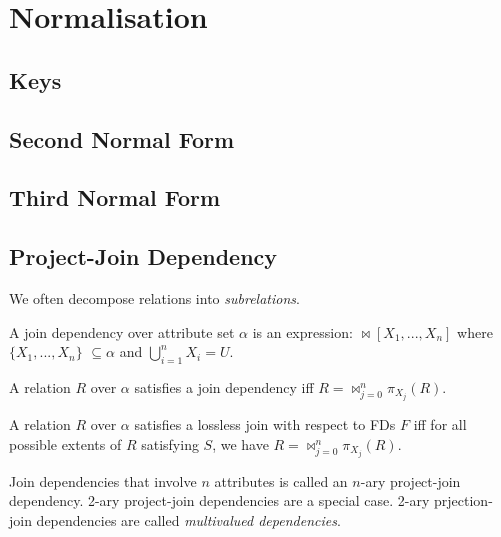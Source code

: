 \chapter{Normalisation}



\section{Keys}


\section{Second Normal Form}



\section{Third Normal Form}



\section{Project-Join Dependency}


We often decompose relations into \textit{subrelations}. 

A join dependency over attribute set $\alpha$ 
is an expression: $\bowtie[X_1, ..., X_n]$ 
where $\{X_1, ...,  X_n\}$ $\subseteq \alpha$ 
and $\bigcup^{n}_{i=1} X_i = U$.

A relation $R$ over $\alpha$ satisfies a 
join dependency
iff $R = \bowtie^{n}_{j=0} \pi_{X_j}(R)$.

A relation $R$ over $\alpha$ satisfies a 
lossless join with respect to FDs $F$ 
iff for all possible extents of $R$ 
satisfying $S$, we have $R = \bowtie^{n}_{j=0} \pi_{X_j}(R)$. 




Join dependencies that involve $n$ attributes is called an 
$n$-ary project-join dependency. 
2-ary project-join dependencies are a special case. 2-ary prjection-join dependencies 
are called \textit{multivalued dependencies}. 


